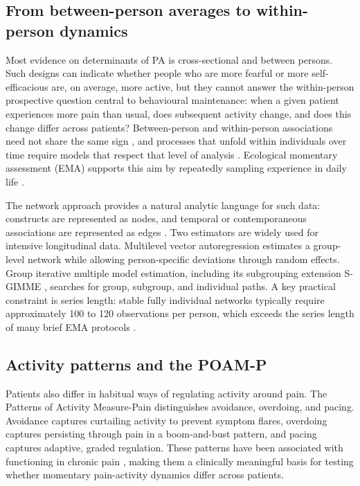 \documentclass[11pt,a4paper]{article}
\begin{document}
\subsection{From between-person averages to within-person dynamics}
Most evidence on determinants of PA is cross-sectional and between persons. Such designs can
indicate whether people who are more fearful or more self-efficacious are, on average, more
active, but they cannot answer the within-person prospective question central to behavioural
maintenance: when a given patient experiences more pain than usual, does subsequent activity
change, and does this change differ across patients? Between-person and within-person
associations need not share the same sign
\citep{curran2011disaggregation,fisher2018lack}, and processes that unfold within
individuals over time require models that respect that level of analysis
\citep{molenaar2004manifesto,hamaker2017no,wright2020personalized,kwasnicka2020nof1}. Ecological momentary
assessment (EMA) supports this aim by repeatedly sampling experience in daily life
\citep{myingermeys2018experience,bolger2013intensive,trull2009using,bentley2019realtime}.

The network approach provides a natural analytic language for such data: constructs are
represented as nodes, and temporal or contemporaneous associations are represented as edges
\citep{borsboom2013network,bringmann2013network,bringmann2016assessing}. Two estimators are
widely used for intensive longitudinal data. Multilevel vector autoregression
\citep[mlVAR;][]{bringmann2013network,epskamp2018gaussian} estimates a group-level network
while allowing person-specific deviations through random effects. Group iterative multiple
model estimation, including its subgrouping extension S-GIMME
\citep{gates2012group,lane2019uncovering}, searches for group, subgroup, and individual
paths. A key practical constraint is series length: stable fully individual networks
typically require approximately 100 to 120 observations per person, which exceeds the series
length of many brief EMA protocols \citep{beltz2016bridging}.

\subsection{Activity patterns and the POAM-P}
Patients also differ in habitual ways of regulating activity around pain. The Patterns of
Activity Measure-Pain \citep[POAM-P;][]{cane2013pain} distinguishes avoidance, overdoing,
and pacing. Avoidance captures curtailing activity to prevent symptom flares, overdoing
captures persisting through pain in a boom-and-bust pattern, and pacing captures adaptive,
graded regulation. These patterns have been associated with functioning in chronic pain
\citep{andrews2012activity,nielson2013activity}, making them a clinically meaningful basis
for testing whether momentary pain-activity dynamics differ across patients.
\end{document}
